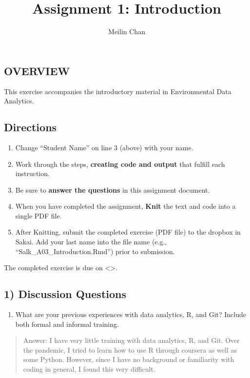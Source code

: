 \documentclass[
]{article}
\title{Assignment 1: Introduction}
\author{Meilin Chan}
\date{}
\providecommand{\tightlist}{%
  \setlength{\itemsep}{0pt}\setlength{\parskip}{0pt}}
\begin{document}
\maketitle

\hypertarget{overview}{%
\subsection{OVERVIEW}\label{overview}}

This exercise accompanies the introductory material in Environmental
Data Analytics.

\hypertarget{directions}{%
\subsection{Directions}\label{directions}}

\begin{enumerate}
\def\labelenumi{\arabic{enumi}.}
\tightlist
\item
  Change ``Student Name'' on line 3 (above) with your name.
\item
  Work through the steps, \textbf{creating code and output} that fulfill
  each instruction.
\item
  Be sure to \textbf{answer the questions} in this assignment document.
\item
  When you have completed the assignment, \textbf{Knit} the text and
  code into a single PDF file.
\item
  After Knitting, submit the completed exercise (PDF file) to the
  dropbox in Sakai. Add your last name into the file name (e.g.,
  ``Salk\_A03\_Introduction.Rmd'') prior to submission.
\end{enumerate}

The completed exercise is due on \textless\textgreater.

\hypertarget{discussion-questions}{%
\subsection{1) Discussion Questions}\label{discussion-questions}}

\begin{enumerate}
\def\labelenumi{\arabic{enumi}.}
\tightlist
\item
  What are your previous experiences with data analytics, R, and Git?
  Include both formal and informal training.
\end{enumerate}

\begin{quote}
Answer: I have very little training with data analytics, R, and Git.
Over the pandemic, I tried to learn how to use R through coursera as
well as some Python. However, since I have no background or familiarity
with coding in general, I found this very difficult.
\end{quote}
\end{document}
